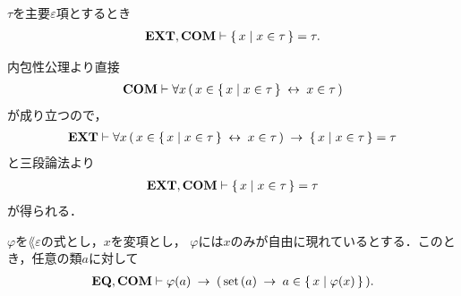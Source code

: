 	\begin{screen}
		\begin{thm}
		\label{thm:critical_epsilon_term_can_be_written_by_intensional_notation}
			$\tau$を主要$\varepsilon$項とするとき
			\begin{align}
				\mbox{{\bf EXT}},\mbox{\bf COM} \vdash \{\, x \mid x \in \tau\, \} = \tau.
			\end{align}
		\end{thm}
	\end{screen}
	
	\begin{sketch}
		内包性公理より直接
		\begin{align}
			\mbox{\bf COM} \vdash \forall x\, (\, x \in \{\, x \mid x \in \tau\, \} \hspace{0.25em}\leftrightarrow\hspace{0.25em} x \in \tau\, )
		\end{align}
		が成り立つので，
		\begin{align}
			\mbox{{\bf EXT}} \vdash \forall x\, (\, x \in \{\, x \mid x \in \tau\, \} \hspace{0.25em}\leftrightarrow\hspace{0.25em} x \in \tau\, ) \hspace{0.25em}\rightarrow\hspace{0.25em} \{\, x \mid x \in \tau\, \} = \tau
		\end{align}
		と三段論法より
		\begin{align}
			\mbox{{\bf EXT}},\mbox{\bf COM} \vdash \{\, x \mid x \in \tau\, \} = \tau
		\end{align}
		が得られる．
		\QED
	\end{sketch}
	
	\begin{screen}
		\begin{thm}[条件を満たす集合は要素である]\label{thm:satisfactory_set_is_an_element}
			$\varphi$を$\lang{\varepsilon}$の式とし，$x$を変項とし，
			$\varphi$には$x$のみが自由に現れているとする．このとき，任意の類$a$に対して
			\begin{align}
				\mbox{{\bf EQ}},\mbox{\bf COM} \vdash \varphi(a) \hspace{0.25em}\rightarrow\hspace{0.25em} 
				(\, \operatorname*{set}\hspace{0.15em}(a) \hspace{0.25em}\rightarrow\hspace{0.25em} a \in \{\, x \mid \varphi(x)\, \}\, ).
			\end{align}
		\end{thm}
	\end{screen}
	
